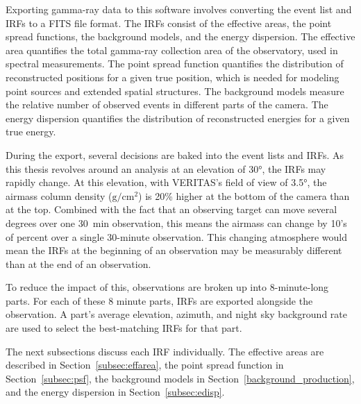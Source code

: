 Exporting gamma-ray data to this software involves converting the event list and IRFs to a FITS file format.
The IRFs consist of the effective areas, the point spread functions, the background models, and the energy dispersion.
The effective area quantifies the total gamma-ray collection area of the observatory, used in spectral measurements.
The point spread function quantifies the distribution of reconstructed positions for a given true position, which is needed for modeling point sources and extended spatial structures.
The background models measure the relative number of observed events in different parts of the camera.
The energy dispersion quantifies the distribution of reconstructed energies for a given true energy.

During the export, several decisions are baked into the event lists and IRFs.
As this thesis revolves around an analysis at an elevation of \nicetilde{}\ang{30}, the IRFs may rapidly change.
At this elevation, with VERITAS's field of view of \ang{3.5}, the airmass column density ($\textrm{g}/\textrm{cm}^2$) is 20\% higher at the bottom of the camera than at the top.
Combined with the fact that an observing target can move several degrees over one \SI{30}{min} observation, this means the airmass can change by 10's of percent over a single 30-minute observation.
This changing atmosphere would mean the IRFs at the beginning of an observation may be measurably different than at the end of an observation.

To reduce the impact of this, observations are broken up into 8-minute-long parts.
For each of these 8 minute parts, IRFs are exported alongside the observation.
A part's average elevation, azimuth, and night sky background rate are used to select the best-matching IRFs for that part.

The next subsections discuss each IRF individually.
The effective areas are described in Section~\ref{subsec:effarea}, the point spread function in Section~\ref{subsec:psf}, the background models in Section~\ref{background_production}, and the energy dispersion in Section~\ref{subsec:edisp}.

\FloatBarrier
  
